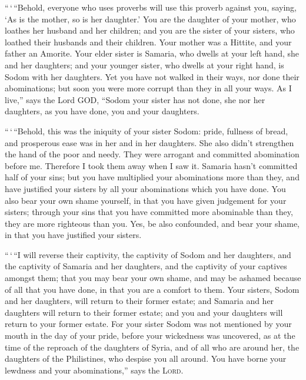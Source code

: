  ``\,`\,``Behold, everyone who uses proverbs will use
this proverb against you, saying, `As is the mother, so is her
daughter.'  You are the daughter of your mother, who
loathes her husband and her children; and you are the sister of your
sisters, who loathed their husbands and their children. Your mother was
a Hittite, and your father an Amorite.  Your elder sister
is Samaria, who dwells at your left hand, she and her daughters; and
your younger sister, who dwells at your right hand, is Sodom with her
daughters.  Yet you have not walked in their ways, nor
done their abominations; but soon you were more corrupt than they in all
your ways.  As I live,'' says the Lord GOD, ``Sodom your
sister has not done, she nor her daughters, as you have done, you and
your daughters.

 ``\,`\,``Behold, this was the iniquity of your sister
Sodom: pride, fullness of bread, and prosperous ease was in her and in
her daughters. She also didn't strengthen the hand of the poor and
needy.  They were arrogant and committed abomination
before me. Therefore I took them away when I saw it. 
Samaria hasn't committed half of your sins; but you have multiplied your
abominations more than they, and have justified your sisters by all your
abominations which you have done.  You also bear your own
shame yourself, in that you have given judgement for your sisters;
through your sins that you have committed more abominable than they,
they are more righteous than you. Yes, be also confounded, and bear your
shame, in that you have justified your sisters.

 ``\,`\,``I will reverse their captivity, the captivity
of Sodom and her daughters, and the captivity of Samaria and her
daughters, and the captivity of your captives amongst them;
 that you may bear your own shame, and may be ashamed
because of all that you have done, in that you are a comfort to them.
 Your sisters, Sodom and her daughters, will return to
their former estate; and Samaria and her daughters will return to their
former estate; and you and your daughters will return to your former
estate.  For your sister Sodom was not mentioned by your
mouth in the day of your pride,  before your wickedness
was uncovered, as at the time of the reproach of the daughters of Syria,
and of all who are around her, the daughters of the Philistines, who
despise you all around.  You have borne your lewdness and
your abominations,'' says the \textsc{Lord}.

